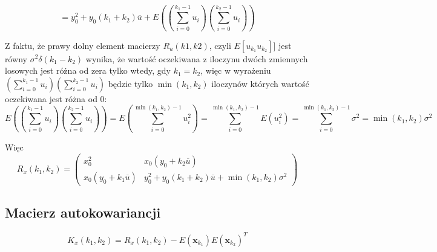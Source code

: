 \documentclass[10pt,a4paper]{article}
\begin{document}
\begin{equation}
     =y_0^2 + y_0(k_1+k_2) \overline{u}+ E \left( \left( \sum \limits_{i=0}^{k_1-1} u_i \right) \left( \sum \limits_{i=0}^{k_2-1} u_i \right) \right)
\end{equation}	

Z faktu, że prawy dolny element macierzy $R_u(k1, k2)$, czyli $ E[u_{k_1}u_{k_2}]]$ jest równy
$\sigma^2 \delta(k_1-k_2)$ wynika, że wartość oczekiwana z iloczynu dwóch zmiennych losowych jest różna od zera tylko wtedy, gdy $k_1 = k_2$, więc w wyrażeniu $ \left( \sum \limits_{i=0}^{k_1-1} u_i \right) \left( \sum \limits_{i=0}^{k_2-1} u_i \right) $ będzie tylko $\min(k_1, k_2)$ iloczynów których wartość oczekiwana jest różna od 0:
\begin{equation}
E\left( \left( \sum \limits_{i=0}^{k_1-1} u_i \right) \left( \sum \limits_{i=0}^{k_2-1} u_i \right) \right) = 
E\left( \sum \limits_{i=0}^{ \min(k_1, k_2) -1}  u_i^2 \right) = 	
\sum \limits_{i=0}^{ \min(k_1, k_2) -1} E\left(  u_i^2 \right) = 
\sum \limits_{i=0}^{ \min(k_1, k_2) -1} \sigma ^2 = \min( k_1, k_2 ) \sigma^2  
\end{equation}

Więc
\begin{equation}
R_x(k_1, k_2) =
\left( 
		\begin{matrix}
			x_{0}^2 & x_0(y_{0} + k_2 \overline{u} ) \\
			x_0(y_{0} + k_1 \overline{u}) & y_0^2 + y_0(k_1+k_2) \overline{u}+\min( k_1, k_2 ) \sigma^2
		\end{matrix}			
	\right)
\end{equation}

\subsection*{Macierz autokowariancji}
\begin{equation}
K_x(k_1, k_2) = R_x(k_1, k_2) - E \left( \textbf{x}_{k_1} \right) E \left( \textbf{x}_{k_2} \right) ^T
\end{equation}
\end{document}
